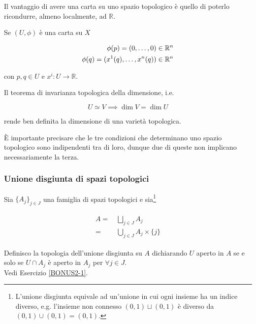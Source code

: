 Il vantaggio di avere una carta su uno spazio topologico è quello di poterlo ricondurre, almeno localmente, ad $ \mathbb{R} $.

\begin{remark}
	Se $ (U,\phi) $ è una carta su $ X $
	
	\begin{align}
		\begin{split}
			\phi(p) = (0,\dots,0) \in \mathbb{R}^{n}\\
			\phi(q) = (x^{1}(q),\dots,x^{n}(q)) \in \mathbb{R}^{n}
		\end{split}
	\end{align}

	con $ p,q \in U $ e $ x^{i} : U \to \mathbb{R} $.
\end{remark}

\begin{remark}
	Il teorema di invarianza topologica della dimensione, i.e.
	
	\begin{equation}
		U \simeq V \implies \dim V = \dim U
	\end{equation}

	rende ben definita la dimensione di una varietà topologica.
\end{remark}

\`{E} importante precisare che le tre condizioni che determinano uno spazio topologico sono indipendenti tra di loro, dunque due di queste non implicano necessariamente la terza.

\subsubsection{Unione disgiunta di spazi topologici}

Sia $ \{A_{j}\}_{j \in J} $ una famiglia di spazi topologici e sia\footnote{%
	L'unione disgiunta equivale ad un'unione in cui ogni insieme ha un indice diverso, e.g. l'insieme non connesso $ (0,1) \sqcup (0,1) $ è diverso da $ (0,1) \cup (0,1) = (0,1) $.}

\begin{align}
	\begin{split}
		A =& \, \bigsqcup_{j \in J} A_{j}\\
		=& \, \bigcup_{j \in J} A_{j} \times \{j\}
	\end{split}
\end{align}

Definisco la topologia dell'unione disgiunta su $ A $ dichiarando $ U $ aperto in $ A $ se e solo se $ U \cap A_{j} $ è aperto in $ A_{j} $ per $ \forall j \in J $.\\
Vedi Esercizio \ref{BONUS2-1}.

